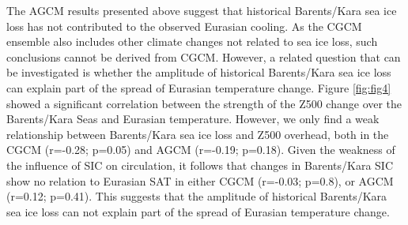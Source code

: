 \documentclass{nature}
\begin{document}
The AGCM results presented above suggest that historical Barents/Kara sea ice loss has not contributed to the observed Eurasian cooling. As the CGCM ensemble also includes other climate changes not related to sea ice loss, such conclusions cannot be derived from CGCM. However, a related question that can be investigated is whether the amplitude of historical Barents/Kara sea ice loss can explain part of the spread of Eurasian temperature change. Figure \ref{fig:fig4} showed a significant correlation between the strength of the Z500 change over the Barents/Kara Seas and Eurasian temperature. However, we only find a weak relationship between Barents/Kara sea ice loss and Z500 overhead, both in the CGCM (r=-0.28; p=0.05) and AGCM (r=-0.19; p=0.18). Given the weakness of the influence of SIC on circulation, it follows that changes in Barents/Kara SIC show no relation to Eurasian SAT in either CGCM (r=-0.03; p=0.8), or AGCM (r=0.12; p=0.41). This suggests that the amplitude of historical Barents/Kara sea ice loss can not explain part of the spread of Eurasian temperature change.


\end{document}
